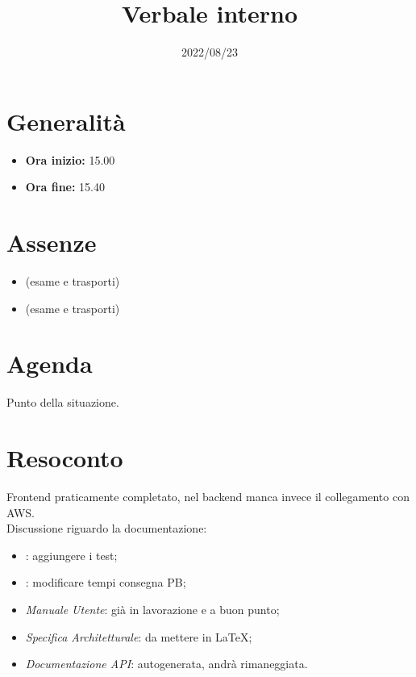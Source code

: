 \documentclass{classes/base}
\title{Verbale interno}
\date{2022/08/23}
\author{\marcob}
\renewcommand{\maketitle}{
    
}
\begin{document}
    \maketitle

    \section*{Generalità}
    \begin{itemize}
        \item \textbf{Ora inizio:} 15.00
        \item \textbf{Ora fine:} 15.40
    \end{itemize}

    \section*{Assenze}
    \begin{itemize}
        \item \matteo{} (esame e trasporti)
        \item \giulio{} (esame e trasporti)
    \end{itemize}

    \section*{Agenda}
    Punto della situazione.

    \section*{Resoconto}
    Frontend praticamente completato, nel backend manca invece il collegamento con AWS.\\
    Discussione riguardo la documentazione: 
    \begin{itemize}
        \item \PdQ: aggiungere i test;
        \item \PdP: modificare tempi consegna PB;
        \item \textit{Manuale Utente}: già in lavorazione e a buon punto;
        \item \textit{Specifica Architetturale}: da mettere in \LaTeX;
        \item \textit{Documentazione API}: autogenerata, andrà rimaneggiata.
    \end{itemize}
\end{document}
